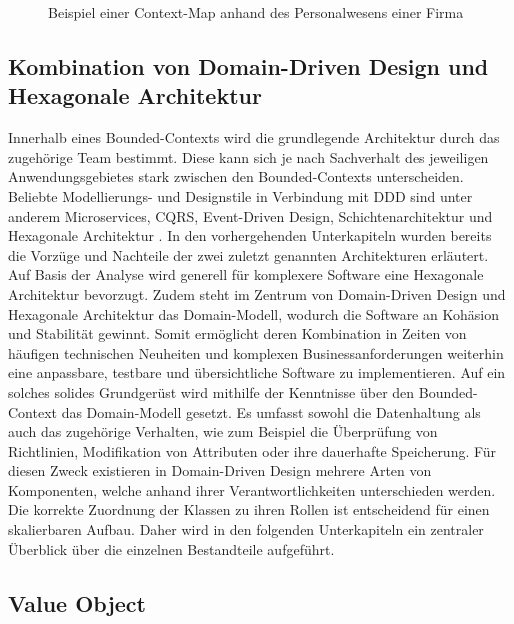 \begin{figure}
	\centering
	\footnotesize
	
	\caption{Beispiel einer Context-Map anhand des Personalwesens einer Firma}
	\label{fig:Context-Map-Example}
\end{figure}

\subsection{Kombination von Domain-Driven Design und Hexagonale Architektur}

Innerhalb eines Bounded-Contexts wird die grundlegende Architektur durch das zugehörige Team bestimmt. Diese kann sich je nach Sachverhalt des jeweiligen Anwendungsgebietes stark zwischen den Bounded-Contexts unterscheiden. Beliebte Modellierungs- und Designstile in Verbindung mit DDD sind unter anderem Microservices, \acrshort{CQRS}, Event-Driven Design, Schichtenarchitektur und Hexagonale Architektur \cite[S. 113ff.]{Vernon.2015}. In den vorhergehenden Unterkapiteln wurden bereits die Vorzüge und Nachteile der zwei zuletzt genannten Architekturen erläutert. Auf Basis der Analyse wird generell für komplexere Software eine Hexagonale Architektur bevorzugt. Zudem steht im Zentrum von Domain-Driven Design und Hexagonale Architektur das Domain-Modell, wodurch die Software an Kohäsion und Stabilität gewinnt. Somit ermöglicht deren Kombination in Zeiten von häufigen technischen Neuheiten und komplexen Businessanforderungen weiterhin eine anpassbare, testbare und übersichtliche Software zu implementieren. Auf ein solches solides Grundgerüst wird mithilfe der Kenntnisse über den Bounded-Context das Domain-Modell gesetzt. Es umfasst sowohl die Datenhaltung als auch das zugehörige Verhalten, wie zum Beispiel die Überprüfung von Richtlinien, Modifikation von Attributen oder ihre dauerhafte Speicherung. Für diesen Zweck existieren in Domain-Driven Design mehrere Arten von Komponenten, welche anhand ihrer Verantwortlichkeiten unterschieden werden. Die korrekte Zuordnung der Klassen zu ihren Rollen ist entscheidend für einen skalierbaren Aufbau. Daher wird in den folgenden Unterkapiteln ein zentraler Überblick über die einzelnen Bestandteile aufgeführt.

\subsection{Value Object}

